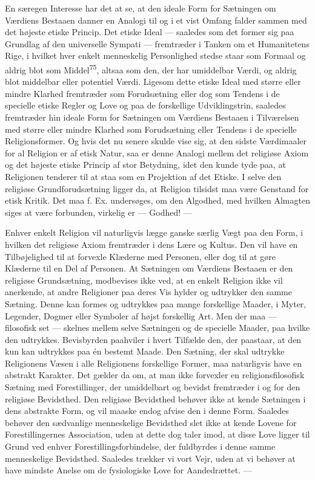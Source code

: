\documentclass[12pt,a4paper,openany]{book}
\newcommand{\opage}[1]{\marginnote{\footnotesize\textit{[#1]}}}
\begin{document}
En særegen Interesse har det at se, at den ideale Form for Sætningen om
Værdiens Bestaaen danner en Analogi til og i et vist Omfang falder
sammen med det højeste etiske Princip. Det etiske Ideal --- saaledes som
det former sig paa Grundlag af den universelle Sympati --- fremtræder i
Tanken om et Humanitetens
\opage{151}Rige, i hvilket hver enkelt menneskelig Personlighed stedse
staar som Formaal og aldrig blot som Middel\textsuperscript{75}, altsaa
som den, der har umiddelbar Værdi, og aldrig blot middelbar eller
potentiel Værdi. Ligesom dette etiske Ideal med større eller mindre
Klarhed fremtræder som Forudsætning eller dog som Tendens i de specielle
etiske Regler og Love og paa de forskellige Udviklingstrin, saaledes
fremtræder hin ideale Form for Sætningen om Værdiens Bestaaen i
Tilværelsen med større eller mindre Klarhed som Forudsætning eller
Tendens i de specielle Religionsformer. Og hvis det nu senere skulde
vise sig, at den sidste Værdimaaler for al Religion er af etisk Natur,
saa er denne Analogi mellem det religiøse Axiom og det højeste etiske
Princip af stor Betydning, idet den kunde tyde paa, at Religionen
tenderer til at staa som en Projektion af det Etiske. I selve den
religiøse Grundforudsætning ligger da, at Religion tilsidst maa være
Genstand for etisk Kritik. Det maa f. Ex. undersøges, om den Algodhed,
med hvilken Almagten siges at være forbunden, virkelig er --- Godhed!
---

Enhver enkelt Religion vil naturligvis lægge ganske særlig Vægt paa den
Form, i hvilken det religiøse Axiom fremtræder i dens Lære og Kultus.
Den vil have en Tilbøjelighed til at forvexle Klæderne med Personen,
eller dog til at gøre Klæderne til en Del af Personen. At Sætningen om
Værdiens Bestaaen er den religiøse Grundsætning, modbevises ikke ved, at
en enkelt Religion ikke vil anerkende, at andre Religioner paa deres Vis
hylder og udtrykker den samme Sætning. Denne kan formes og udtrykkes paa
mange forskellige Maader, i Myter, Legender, Dogmer eller Symboler af
højst forskellig Art. Men der maa --- filosofisk set --- skelnes mellem
selve Sætningen og de specielle Maader, paa hvilke den udtrykkes.
Bevisbyrden paahviler i hvert Tilfælde den, der paastaar, at den kun kan
udtrykkes paa én bestemt Maade. Den Sætning, der skal udtrykke
Religionens Væsen i alle Religionens forskellige Former, maa naturligvis
have en abstrakt Karakter. Det gælder da om, at man ikke forvexler en
religionsfilosofisk Sætning med Forestillinger, der umiddelbart og
bevidst fremtræder i og for den religiøse Bevidsthed. Den religiøse
Bevidsthed behøver ikke at kende Sætningen i dens abstrakte Form, og vil
maaske endog afvise den i denne Form. Saaledes behøver den sædvanlige
menneskelige Bevidsthed slet ikke at kende Lovene for Forestillingernes
Association, uden at dette dog taler imod, at disse Love ligger til
Grund ved enhver Forestillingsforbindelse,
\opage{152}der fuldbyrdes i denne samme menneskelige Bevidsthed.
Saaledes trækker vi vort Vejr, uden at vi behøver at have mindste Anelse
om de fysiologiske Love for Aandedrættet. ---
\end{document}
